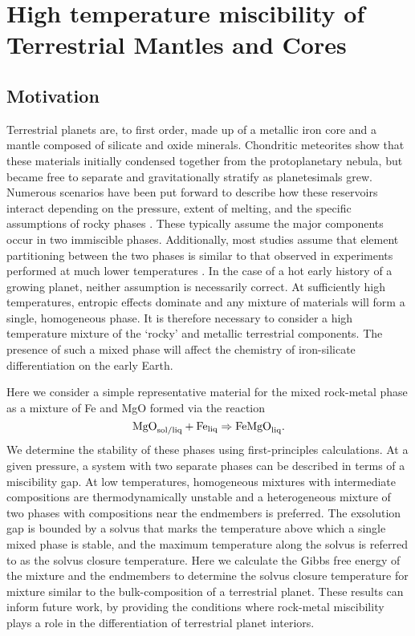 \chapter{High temperature miscibility of Terrestrial Mantles and Cores}\label{chap4}

\section{Motivation}

Terrestrial planets are, to first order, made up of a metallic iron core and a mantle
composed of silicate and oxide minerals. Chondritic meteorites show that these materials
initially condensed together from the protoplanetary nebula, but became free to separate
and gravitationally stratify as planetesimals grew.  Numerous scenarios have been put
forward to describe how these reservoirs interact depending on the pressure, extent of
melting, and the specific assumptions of rocky phases
\citep{Stevenson1990,Solomatov2007,Rubie2007}. These typically assume the major components
occur in two immiscible phases. Additionally, most studies assume that element
partitioning between the two phases is similar to that observed in experiments performed
at much lower temperatures \citep{Mcdonough1995}. In the case of a hot early history of a
growing planet, neither assumption is necessarily correct. At sufficiently high
temperatures, entropic effects dominate and any mixture of materials will form a single,
homogeneous phase. It is therefore necessary to consider a high temperature mixture of
the `rocky' and metallic terrestrial components. The presence of such a mixed phase will
affect the chemistry of iron-silicate differentiation on the early Earth.

Here we consider a simple representative material for the mixed rock-metal phase as a mixture
of Fe and MgO formed via the reaction
\begin{equation} 
  \rm{MgO}_{\rm sol/liq} + \rm{Fe}_{\rm liq} \Rightarrow \rm{FeMgO}_{\rm liq}.
\end{equation}
We determine the stability of these phases using first-principles calculations.  At a
given pressure, a system with two separate phases can be described in terms of a
miscibility gap. At low temperatures, homogeneous mixtures with intermediate compositions
are thermodynamically unstable and a heterogeneous mixture of two phases with
compositions near the endmembers is preferred. The exsolution gap is bounded by a solvus
that marks the temperature above which a single mixed phase is stable, and the maximum
temperature along the solvus is referred to as the solvus closure temperature. Here we calculate
the Gibbs free energy of the mixture and the endmembers to determine the solvus closure
temperature for mixture similar to the bulk-composition of a terrestrial planet. These
results can inform future work, by providing the conditions where rock-metal miscibility
plays a role in the differentiation of terrestrial planet interiors.


